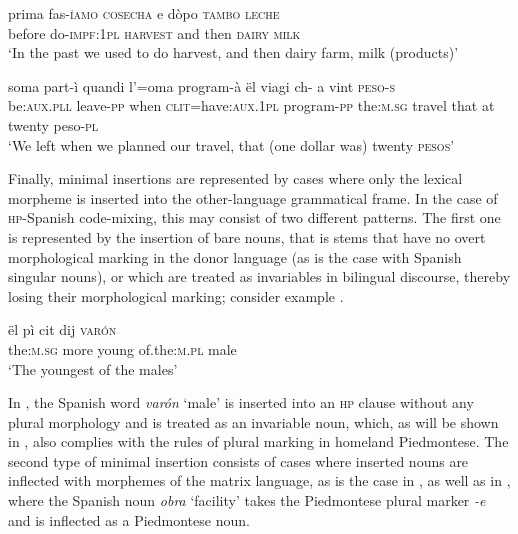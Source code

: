 \documentclass[output=paper]{langscibook}
\begin{document}
\ea%
    \label{ex:goria:4}
    \gll prima fas-\textsc{íamo} \textsc{cosecha} e dòpo \textsc{tambo} \textsc{leche}\\
         before do-\textsc{impf}:\textsc{1pl} \textsc{harvest} and then   \textsc{dairy} \textsc{milk}\\
    \glt ‘In the past we used to do harvest, and then dairy farm, milk (products)’
\z %

\ea%
    \label{ex:goria:5}
    \gll soma part-ì quandi l'=oma program-à ël viagi ch- a vint \textsc{peso}{}-\textsc{s}\\
         be:\textsc{aux}.\textsc{pll} leave-\textsc{pp} when \textsc{clit}=have:\textsc{aux}.\textsc{1pl} program-\textsc{pp} the:\textsc{m.sg} travel that at twenty peso-\textsc{pl}\\
    \glt ‘We left when we planned our travel, that (one dollar was) twenty \textsc{pesos’}
\z %

Finally, minimal insertions are represented by cases where only the lexical morpheme is inserted into the other-language grammatical frame. In the case of \textsc{hp}{}-Spanish code-mixing, this may consist of two different patterns. The first one is represented by the insertion of bare nouns, that is stems that have no overt morphological marking in the donor language (as is the case with Spanish singular nouns), or which are treated as invariables in bilingual discourse, thereby losing their morphological marking; consider example .

\ea%
    \label{ex:goria:6}
    \gll ël pì cit dij \textsc{varón}\\
         the:\textsc{m.sg} more young of.the:\textsc{m}.\textsc{pl} male\\
    \glt ‘The youngest of the males’
\z %

In , the Spanish word \textit{varón} ‘male’ is inserted into an \textsc{hp} clause without any plural morphology and is treated as an invariable noun, which, as will be shown in , also complies with the rules of plural marking in homeland Piedmontese. The second type of minimal insertion consists of cases where inserted nouns are inflected with morphemes of the matrix language, as is the case in , as well as in , where the Spanish noun \textit{obra} ‘facility’ takes the Piedmontese plural marker \textit{{}-e} and is inflected as a Piedmontese noun.
\end{document}
